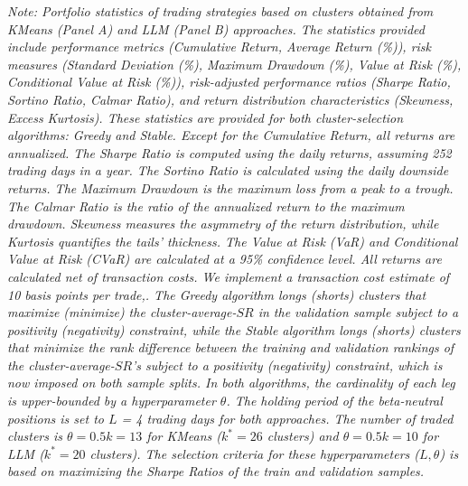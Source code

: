 \begin{table}[H]
\vspace{0.5cm}
\begin{minipage}{\textwidth}
\setlength{\parindent}{0pt}
{\small\textit{Note:
Portfolio statistics of trading strategies based on clusters obtained from KMeans (Panel A) and LLM (Panel B) approaches.
The statistics provided include performance metrics (Cumulative Return, Average Return (\%)), risk measures (Standard Deviation (\%), Maximum Drawdown (\%), Value at Risk (\%), Conditional Value at Risk (\%)), risk-adjusted performance ratios (Sharpe Ratio, Sortino Ratio, Calmar Ratio), and return distribution characteristics (Skewness, Excess Kurtosis). These statistics are provided for both cluster-selection algorithms: Greedy and Stable.
Except for the Cumulative Return, all returns are annualized. The Sharpe Ratio is computed using the daily returns, assuming 252 trading days in a year. The Sortino Ratio is calculated using the daily downside returns. The Maximum Drawdown is the maximum loss from a peak to a trough. The Calmar Ratio is the ratio of the annualized return to the maximum drawdown. Skewness measures the asymmetry of the return distribution, while Kurtosis quantifies the tails' thickness. The Value at Risk (VaR) and Conditional Value at Risk (CVaR) are calculated at a 95\% confidence level.
%
All returns are calculated net of transaction costs. 
We implement a %
transaction cost estimate of 10 basis points %
per trade,.
%
The Greedy algorithm longs (shorts) clusters that maximize (minimize) the cluster-average-$SR$ in the validation sample subject to a positivity (negativity) constraint, while the Stable algorithm longs (shorts) clusters that minimize the rank difference between the training and validation rankings of the cluster-average-$SR$'s subject to a positivity (negativity) constraint, which is now imposed on both sample splits. In both algorithms, the cardinality of each leg is upper-bounded by a hyperparameter $\theta$.
The holding period of the beta-neutral positions is set to $L$ = 4 trading days for both approaches. The number of traded clusters is $\theta = 0.5k=13$ for KMeans ($k^*=26$ clusters) and $\theta = 0.5k=10$ for LLM ($k^*=20$ clusters). The selection criteria for these hyperparameters ($L,\theta$) is based on maximizing the Sharpe Ratios of the train and validation samples.
}}
\end{minipage}
\end{table}
